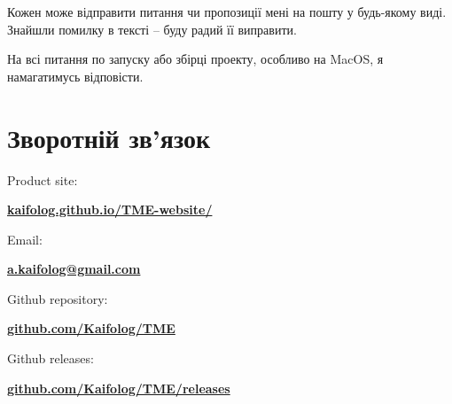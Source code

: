 \documentclass[oneside,final,14pt]{extreport}
\begin{document}
Кожен може відправити питання чи пропозиції мені на пошту у будь-якому виді. Знайшли помилку в тексті -- буду радий її виправити.

На всі питання по запуску або збірці проекту, особливо на MacOS, я намагатимусь відповісти.

\section*{Зворотній зв'язок}

Product site:

{\bfseries \href{https://kaifolog.github.io/TME-website/}{kaifolog.github.io/TME-website/}}

Email:

{\bfseries \href{mailto:a.kaifolog@gmail.com}{a.kaifolog@gmail.com}}

\bigskip

Github repository:

{\bfseries \href{https://github.com/Kaifolog/TME}{github.com/Kaifolog/TME}}

Github releases:

{\bfseries \href{https://github.com/Kaifolog/TME/releases}{github.com/Kaifolog/TME/releases}}
\end{document}
